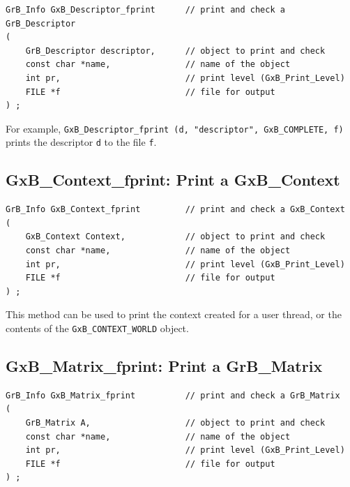 \begin{mdframed}[userdefinedwidth=6in]
{\footnotesize
\begin{verbatim}
GrB_Info GxB_Descriptor_fprint      // print and check a GrB_Descriptor
(
    GrB_Descriptor descriptor,      // object to print and check
    const char *name,               // name of the object
    int pr,                         // print level (GxB_Print_Level)
    FILE *f                         // file for output
) ;
\end{verbatim} } \end{mdframed}

For example,
\verb'GxB_Descriptor_fprint (d, "descriptor", GxB_COMPLETE, f)'
prints the descriptor \verb'd' to the file \verb'f'.

\subsection{{\sf GxB\_Context\_fprint:} Print a {\sf GxB\_Context}}
\label{context_print}

\begin{mdframed}[userdefinedwidth=6in]
{\footnotesize
\begin{verbatim}
GrB_Info GxB_Context_fprint         // print and check a GxB_Context
(
    GxB_Context Context,            // object to print and check
    const char *name,               // name of the object
    int pr,                         // print level (GxB_Print_Level)
    FILE *f                         // file for output
) ;
\end{verbatim} } \end{mdframed}

This method can be used to print the context created for a user thread,
or the contents of the \verb'GxB_CONTEXT_WORLD' object.

\subsection{{\sf GxB\_Matrix\_fprint:} Print a {\sf GrB\_Matrix}}

\begin{mdframed}[userdefinedwidth=6in]
{\footnotesize
\begin{verbatim}
GrB_Info GxB_Matrix_fprint          // print and check a GrB_Matrix
(
    GrB_Matrix A,                   // object to print and check
    const char *name,               // name of the object
    int pr,                         // print level (GxB_Print_Level)
    FILE *f                         // file for output
) ;
\end{verbatim} } \end{mdframed}

